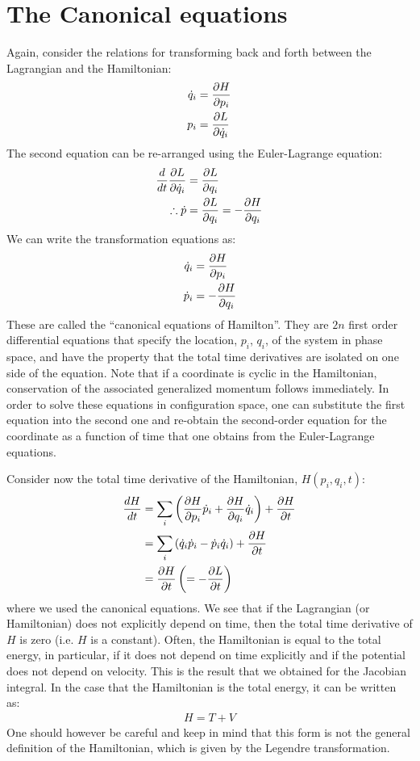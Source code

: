 \section{The Canonical equations}
Again, consider the relations for transforming back and forth between the Lagrangian and the Hamiltonian:
\begin{align}
\dot q_i&=\frac{\partial H}{\partial p_i} \nonumber\\
p_i &= \frac{\partial L}{\partial \dot q_i} 
\end{align}
The second equation can be re-arranged using the Euler-Lagrange equation:
\begin{align}
\frac{d}{dt}\frac{\partial L}{\partial \dot q_i}&=\frac{\partial L}{\partial q_i}\nonumber\\
\therefore \dot p&=\frac{\partial L}{\partial q_i}= -\frac{\partial H}{\partial q_i}
\end{align}
We can write the transformation equations as:
\begin{align}
\dot q_i&=\frac{\partial H}{\partial p_i} \nonumber\\
\dot p_i &= -\frac{\partial H}{\partial q_i}
\end{align}
These are called the ``canonical equations of Hamilton''. They are $2n$ first order differential equations that specify the location, $p_i$, $q_i$, of the system in phase space, and have the property that the total time derivatives are isolated on one side of the equation. Note that if a coordinate is cyclic in the Hamiltonian, conservation of the associated generalized momentum follows immediately. In order to solve these equations in configuration space, one can substitute the first equation into the second one and re-obtain the second-order equation for the coordinate as a function of time that one obtains from the Euler-Lagrange equations.

Consider now the total time derivative of the Hamiltonian, $H(p_i,q_i,t)$:
\begin{align}
\frac{dH}{dt}&= \sum_i\left(\frac{\partial H}{\partial p_i}\dot p_i +\frac{\partial H}{\partial q_i}\dot q_i  \right)+\frac{\partial H}{\partial t}\nonumber\\
&= \sum_i\left(\dot q_i\dot p_i -\dot p_i\dot q_i  \right)+\frac{\partial H}{\partial t}\nonumber\\
&= \frac{\partial H}{\partial t} \left(=-\frac{\partial L}{\partial t}\right)
\end{align}
where we used the canonical equations. We see that if the Lagrangian (or Hamiltonian) does not explicitly depend on time, then the total time derivative of $H$ is zero (i.e. $H$ is a constant). Often, the Hamiltonian is equal to the total energy, in particular, if it does not depend on time explicitly and if the potential does not depend on velocity. This is the result that we obtained for the Jacobian integral. In the case that the Hamiltonian is the total energy, it can be written as:
\begin{align}
H=T+V
\end{align}
One should however be careful and keep in mind that this form is not the general definition of the Hamiltonian, which is given by the Legendre transformation.


